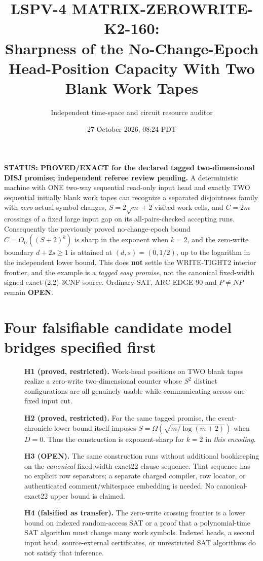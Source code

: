 \documentclass[11pt]{article}
\title{LSPV-4 MATRIX-ZEROWRITE-K2-160:\\
Sharpness of the No-Change-Epoch Head-Position Capacity With Two Blank Work Tapes}
\author{Independent time-space and circuit resource auditor}
\date{27 October 2026, 08:24 PDT}
\begin{document}
\maketitle
\noindent\textbf{STATUS: PROVED/EXACT for the declared tagged two-dimensional DISJ promise; independent referee review pending.}
A deterministic machine with ONE two-way sequential read-only input head and exactly TWO sequential initially blank work tapes can recognize a separated disjointness family with \emph{zero} actual symbol changes, \(S=2\sqrt m+2\) visited work cells, and \(C=2m\) crossings of a fixed large input gap on its all-pairs-checked accepting runs. Consequently the previously proved no-change-epoch bound \(C=O_U((S+2)^k)\) is sharp in the exponent when \(k=2\), and the zero-write boundary \(d+2s\ge1\) is attained at \((d,s)=(0,1/2)\), up to the logarithm in the independent lower bound. This does \textbf{not} settle the WRITE-TIGHT2 interior frontier, and the example is a \emph{tagged easy promise}, not the canonical fixed-width signed exact-(2,2)-3CNF source. Ordinary SAT, ARC-EDGE-90 and \(P\ne NP\) remain \textbf{OPEN}.

\section{Four falsifiable candidate model bridges specified first}
\begin{description}
\item[] \textbf{H1 (proved, restricted).} Work-head positions on TWO blank tapes realize a zero-write two-dimensional counter whose \(S^2\) distinct configurations are all genuinely usable while communicating across one fixed input cut.
\item[] \textbf{H2 (proved, restricted).} For the same tagged promise, the event-chronicle lower bound itself imposes \(S=\Omega(\sqrt{m/\log(m+2)})\) when \(D=0\). Thus the construction is exponent-sharp for \(k=2\) in \emph{this encoding}.
\item[] \textbf{H3 (OPEN).} The same construction runs without additional bookkeeping on the \emph{canonical} fixed-width exact22 clause sequence. That sequence has no explicit row separators; a separate charged compiler, row locator, or authenticated comment/whitespace embedding is needed. No canonical-exact22 upper bound is claimed.
\item[] \textbf{H4 (falsified as transfer).} The zero-write crossing frontier is a lower bound on indexed random-access SAT or a proof that a polynomial-time SAT algorithm must change many work symbols. Indexed heads, a second input head, source-external certificates, or unrestricted SAT algorithms do not satisfy that inference.
\end{description}
\end{document}
